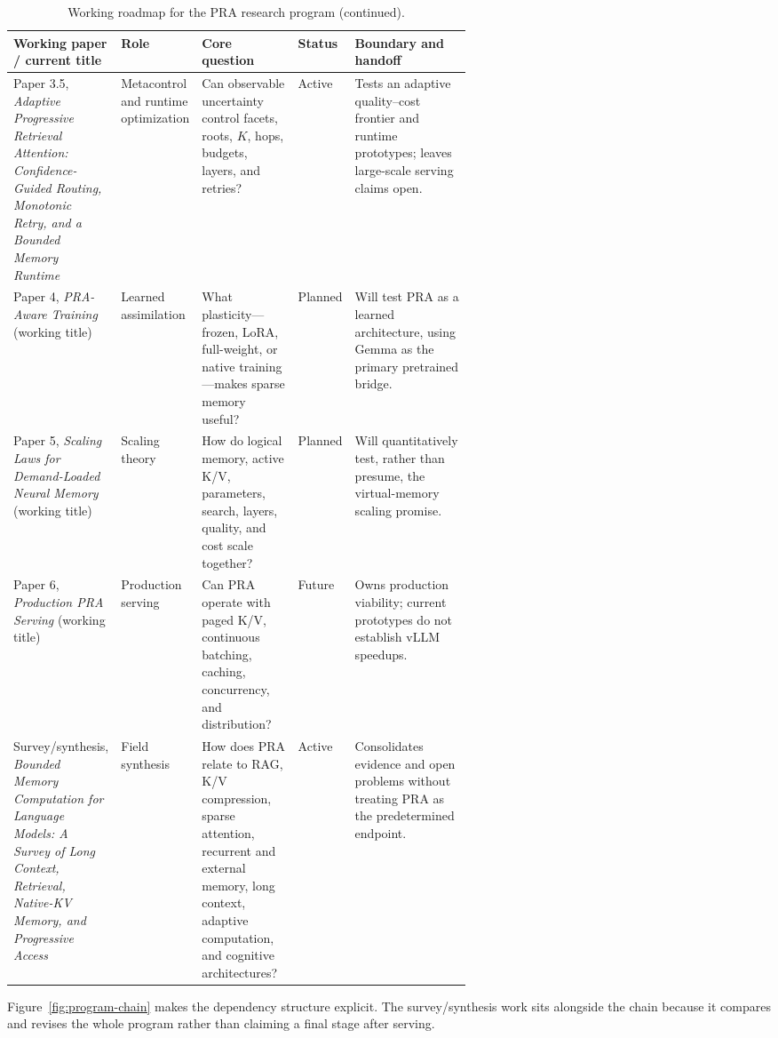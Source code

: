 \documentclass[11pt]{article}
\begin{document}
\begin{table}[p]
\centering
\begingroup
\scriptsize
\setlength{\tabcolsep}{3pt}
\renewcommand{\arraystretch}{1.08}
\caption{Working roadmap for the PRA research program (continued).}
\begin{tabularx}{\textwidth}{@{}P{0.17\linewidth}P{0.12\linewidth}P{0.21\linewidth}P{0.105\linewidth}X@{}}
\toprule
Working paper / current title & Role & Core question & Status & Boundary and handoff \\
\midrule
Paper 3.5, \emph{Adaptive Progressive Retrieval Attention: Confidence-Guided Routing, Monotonic Retry, and a Bounded Memory Runtime}
& Metacontrol and runtime optimization
& Can observable uncertainty control facets, roots, $K$, hops, budgets, layers, and retries?
& Active
& Tests an adaptive quality--cost frontier and runtime prototypes; leaves large-scale serving claims open. \\
Paper 4, \emph{PRA-Aware Training} (working title)
& Learned assimilation
& What plasticity---frozen, LoRA, full-weight, or native training---makes sparse memory useful?
& Planned
& Will test PRA as a learned architecture, using Gemma as the primary pretrained bridge. \\
Paper 5, \emph{Scaling Laws for Demand-Loaded Neural Memory} (working title)
& Scaling theory
& How do logical memory, active K/V, parameters, search, layers, quality, and cost scale together?
& Planned
& Will quantitatively test, rather than presume, the virtual-memory scaling promise. \\
Paper 6, \emph{Production PRA Serving} (working title)
& Production serving
& Can PRA operate with paged K/V, continuous batching, caching, concurrency, and distribution?
& Future
& Owns production viability; current prototypes do not establish vLLM speedups. \\
Survey/synthesis, \emph{Bounded Memory Computation for Language Models: A Survey of Long Context, Retrieval, Native-KV Memory, and Progressive Access}
& Field synthesis
& How does PRA relate to RAG, K/V compression, sparse attention, recurrent and external memory,
long context, adaptive computation, and cognitive architectures?
& Active
& Consolidates evidence and open problems without treating PRA as the predetermined endpoint. \\
\bottomrule
\end{tabularx}
\endgroup
\end{table}

Figure~\ref{fig:program-chain} makes the dependency structure explicit.  The survey/synthesis
work sits alongside the chain because it compares and revises the whole program rather than
claiming a final stage after serving.
\end{document}

